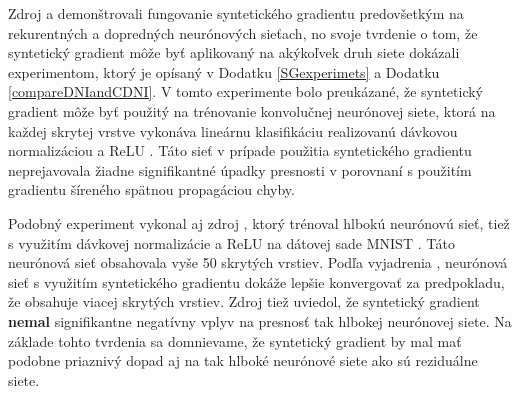 Zdroj \cite{Jaderberg2016} a \cite{Czarnecki2017} demonštrovali fungovanie syntetického gradientu predovšetkým na rekurentných a dopredných neurónových sieťach, no svoje tvrdenie o tom, že syntetický gradient môže byť aplikovaný na akýkoľvek druh siete dokázali experimentom, ktorý je opísaný v Dodatku \ref{SGexperimets} a Dodatku \ref{compareDNIandCDNI}. V tomto experimente bolo preukázané, že syntetický gradient môže byť použitý na trénovanie konvolučnej neurónovej siete, ktorá na každej skrytej vrstve vykonáva lineárnu klasifikáciu realizovanú dávkovou normalizáciou \cite{Goh1995} a ReLU \cite{Goh1995, Xu2015}. Táto sieť v prípade použitia syntetického gradientu neprejavovala žiadne signifikantné úpadky presnosti v porovnaní s použitím gradientu šíreného spätnou propagáciou chyby.

Podobný experiment vykonal aj zdroj \cite{Czarnecki2017}, ktorý trénoval hlbokú neurónovú sieť, tiež s využitím dávkovej normalizácie a ReLU na dátovej sade MNIST \cite{yann1998mnist}. Táto neurónová sieť obsahovala vyše 50 skrytých vrstiev. Podľa vyjadrenia \cite{Czarnecki2017}, neurónová sieť s využitím syntetického gradientu dokáže lepšie konvergovať za predpokladu, že obsahuje viacej skrytých vrstiev. Zdroj \cite{Czarnecki2017} tiež uviedol, že syntetický gradient \textbf{nemal} signifikantne negatívny vplyv na presnosť tak hlbokej neurónovej siete. Na základe tohto tvrdenia sa domnievame, že syntetický gradient by mal mať podobne priaznivý dopad aj na tak hlboké neurónové siete ako sú reziduálne siete.